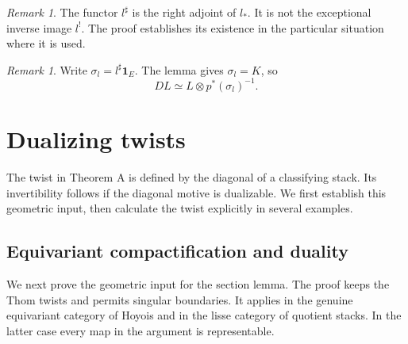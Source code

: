 \documentclass[11pt,reqno]{amsart}
\theoremstyle{definition}
\theoremstyle{remark}
\newtheorem{remark}[theorem]{Remark}
\theoremstyle{plain}
\numberwithin{equation}{section}
\newcommand{\one}{\mathbf 1}
\begin{document}
\begin{remark}
The functor \(l^\sharp\) is the right adjoint of \(l_*\).
It is not the exceptional inverse image \(l^!\).
The proof establishes its existence in the particular situation where it is used.
\end{remark}


\begin{remark}\label{rem:new-section-sign}
Write \(\sigma_l=l^\sharp\one_E\).
The lemma gives \(\sigma_l=K\), so
\[
 DL\simeq L\otimes p^*(\sigma_l)^{-1}.
\]
\end{remark}


\section{Dualizing twists}
\label{sec:new-twist}\label{sec:duality}

The twist in Theorem A is defined by the diagonal of a classifying stack.
Its invertibility follows if the diagonal motive is dualizable.
We first establish this geometric input, then calculate the twist explicitly in
several examples.

\subsection{Equivariant compactification and duality}

We next prove the geometric input for the section lemma.
The proof keeps the Thom twists and permits singular boundaries.
It applies in the genuine equivariant category of Hoyois \cite{Hoyois}
and in the lisse category of quotient stacks.
In the latter case every map in the argument is representable.
\end{document}
